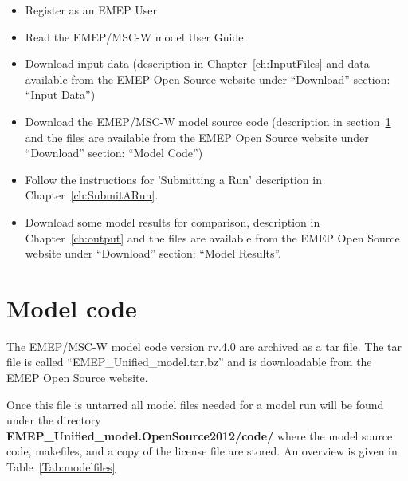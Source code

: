 \begin{itemize}
\item Register as an EMEP User
\item Read the EMEP/MSC-W model User Guide
\item
Download input data (description in Chapter~\ref{ch:InputFiles} and
data available from the EMEP Open Source website under ``Download''
section: ``Input Data'')
\item
Download the EMEP/MSC-W model source code (description in 
section~\ref{sec:ModelCode} and the files are available from the EMEP 
Open Source website under ``Download'' section: ``Model Code'')
\item
Follow the instructions for 'Submitting a Run' description in
Chapter~\ref{ch:SubmitARun}.
\item
Download some model results for comparison, description in
Chapter~\ref{ch:output} and the files are available from the EMEP 
Open Source website under ``Download'' section: ``Model Results''. 


\end{itemize}

\section{Model code}
\label{sec:ModelCode}

The EMEP/MSC-W model code version rv.4.0 are archived as a tar file. 
The tar file is called ``EMEP\_Unified\_model.tar.bz'' and is downloadable from
the EMEP Open Source website.

Once this file is untarred all model files needed for a model run will be found under the
directory \\ {\bf EMEP\_Unified\_model.OpenSource2012/code/} where the model source code, 
makefiles, and a copy of the license file are stored. An overview is given in 
Table~\ref{Tab:modelfiles}

